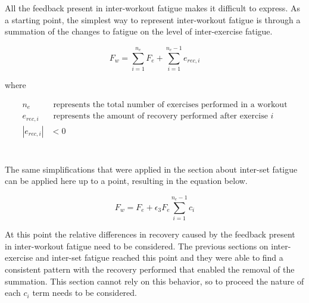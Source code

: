 All the feedback present in inter-workout fatigue makes it difficult to express. As a starting point, the simplest way to represent inter-workout fatigue is through a summation of the changes to fatigue on the level of inter-exercise fatigue.

\begin{minipage}{\textwidth}
	\begin{equation*}
		F_w=\sum_{i=1}^{n_e} F_e+\sum_{i=1}^{n_e-1} e_{rec,i}
	\end{equation*}
	\centerline{where}
	\begin{equation*}
		\begin{split}
			n_e & \text{ represents the total number of exercises performed in a workout} \\
			e_{rec,i} & \text{ represents the amount of recovery performed after exercise }i \\
			|e_{rec,i}| & < 0 \\
		\end{split}
	\end{equation*}
\end{minipage}\\

The same simplifications that were applied in the section about inter-set fatigue can be applied here up to a point, resulting in the equation below.

\begin{equation*}
	F_w =
	F_{e} + \epsilon_3 F_e \sum_{i=1}^{n_e-1} c_i
\end{equation*}

At this point the relative differences in recovery caused by the feedback present in inter-workout fatigue need to be considered. The previous sections on inter-exercise and inter-set fatigue reached this point and they were able to find a consistent pattern with the recovery performed that enabled the removal of the summation. This section cannot rely on this behavior, so to proceed the nature of each $c_i$ term needs to be considered. 

